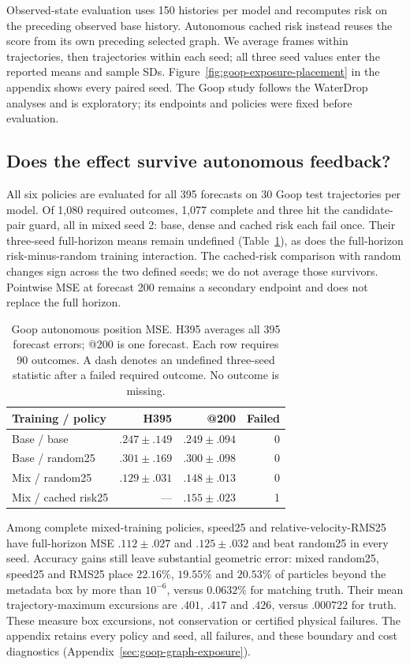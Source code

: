 Observed-state evaluation uses 150 histories per model and recomputes risk on the preceding observed base history. Autonomous cached risk instead reuses the score from its own preceding selected graph. We average frames within trajectories, then trajectories within each seed; all three seed values enter the reported means and sample SDs. Figure~\ref{fig:goop-exposure-placement} in the appendix shows every paired seed. The Goop study follows the WaterDrop analyses and is exploratory; its endpoints and policies were fixed before evaluation.

\subsection{Does the effect survive autonomous feedback?}
All six policies are evaluated for all 395 forecasts on 30 Goop test trajectories per model. Of 1,080 required outcomes, 1,077 complete and three hit the candidate-pair guard, all in mixed seed 2: base, dense and cached risk each fail once. Their three-seed full-horizon means remain undefined (Table~\ref{tab:goop-rollouts}), as does the full-horizon risk-minus-random training interaction. The cached-risk comparison with random changes sign across the two defined seeds; we do not average those survivors. Pointwise MSE at forecast 200 remains a secondary endpoint and does not replace the full horizon.

\begin{table}[t]
\centering\small
\caption{Goop autonomous position MSE. H395 averages all 395 forecast errors; @200 is one forecast. Each row requires 90 outcomes. A dash denotes an undefined three-seed statistic after a failed required outcome. No outcome is missing.}
\label{tab:goop-rollouts}
\setlength{\tabcolsep}{3pt}
\begin{tabular}{lrrr}
\toprule
Training / policy & H395 & @200 & Failed\\
\midrule
Base / base & $.247\pm.149$ & $.249\pm.094$ & 0\\
Base / random25 & $.301\pm.169$ & $.300\pm.098$ & 0\\
Mix / random25 & $.129\pm.031$ & $.148\pm.013$ & 0\\
Mix / cached risk25 & --- & $.155\pm.023$ & 1\\
\bottomrule
\end{tabular}
\end{table}

Among complete mixed-training policies, speed25 and relative-velocity-RMS25 have full-horizon MSE $.112\pm.027$ and $.125\pm.032$ and beat random25 in every seed. Accuracy gains still leave substantial geometric error: mixed random25, speed25 and RMS25 place $22.16\%$, $19.55\%$ and $20.53\%$ of particles beyond the metadata box by more than $10^{-6}$, versus $0.0632\%$ for matching truth. Their mean trajectory-maximum excursions are $.401$, $.417$ and $.426$, versus $.000722$ for truth. These measure box excursions, not conservation or certified physical failures. The appendix retains every policy and seed, all failures, and these boundary and cost diagnostics (Appendix~\ref{sec:goop-graph-exposure}).

